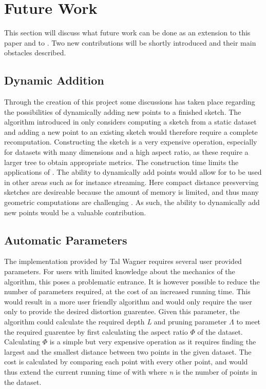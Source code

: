 \section{Future Work}
\label{futurework}
This section will discuss what future work can be done as an extension to this paper and to \cite{wagner17}. Two new contributions will be shortly introduced and their main obstacles described. 

\subsection{Dynamic Addition}
Through the creation of this project some discussions has taken place regarding the possibilities of dynamically adding new points to a finished sketch. The algorithm introduced in \cite{wagner17} only considers computing a sketch from a static dataset and adding a new point to an existing sketch would therefore require a complete recomputation. Constructing the sketch is a very expensive operation, especially for datasets with many dimensions and a high aspect ratio, as these require a larger tree to obtain appropriate metrics. The construction time limits the applications of \qs{}. The ability to dynamically add points would allow for \qs{} to be used in other areas such as for instance streaming. Here compact distance presverving sketches are desireable because the amount of memory is limited, and thus many geometric computations are  challenging \cite{ShanM}. As such, the ability to dynamically add new points would be a valuable contribution. 

\subsection{Automatic Parameters}
The implementation provided by Tal Wagner requires several user provided parameters. For users with limited knowledge about the mechanics of the algorithm, this poses a problematic entrance. It is however possible to reduce the number of parameters required, at the cost of an increased running time. This would result in a more user friendly algorithm and would only require the user only to provide the desired distortion guarentee. Given this parameter, the algorithm could calculate the required depth \textit{L} and pruning parameter $\Lambda$ to meet the required guarentee by first calculating the aspect ratio $\Phi$ of the dataset. Calculating $\Phi$ is a simple but very expensive operation as it requires finding the largest and the smallest distance between two points in the given dataset. The cost is calculated by comparing each point with every other point, and would thus extend the current running time of \qs{} with  where \textit{n} is the number of points in the dataset. 

